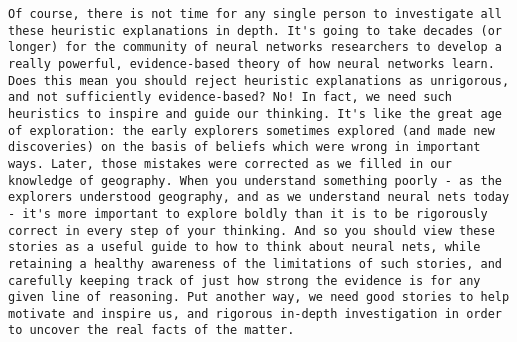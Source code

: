 \begin{lstlisting}
Of course, there is not time for any single person to investigate all these heuristic explanations in depth. It's going to take decades (or longer) for the community of neural networks researchers to develop a really powerful, evidence-based theory of how neural networks learn. Does this mean you should reject heuristic explanations as unrigorous, and not sufficiently evidence-based? No! In fact, we need such heuristics to inspire and guide our thinking. It's like the great age of exploration: the early explorers sometimes explored (and made new discoveries) on the basis of beliefs which were wrong in important ways. Later, those mistakes were corrected as we filled in our knowledge of geography. When you understand something poorly - as the explorers understood geography, and as we understand neural nets today - it's more important to explore boldly than it is to be rigorously correct in every step of your thinking. And so you should view these stories as a useful guide to how to think about neural nets, while retaining a healthy awareness of the limitations of such stories, and carefully keeping track of just how strong the evidence is for any given line of reasoning. Put another way, we need good stories to help motivate and inspire us, and rigorous in-depth investigation in order to uncover the real facts of the matter.

\end{lstlisting}
